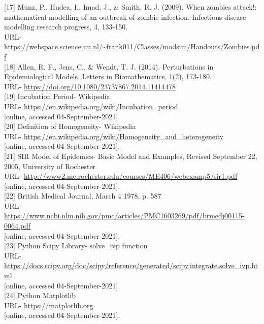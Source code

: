 [17] Munz, P., Hudea, I., Imad, J., \& Smith, R. J. (2009). When zombies attack!: mathematical modelling of an outbreak of zombie infection. Infectious disease modelling research progress, 4, 133-150. \\
URL- \url{https://webspace.science.uu.nl/~frank011/Classes/modsim/Handouts/Zombies.pdf} \\

[18] Allen, R. F., Jens, C., \& Wendt, T. J. (2014). Perturbations in Epidemiological Models. Letters in Biomathematics, 1(2), 173-180. \\
URL- \url{https://doi.org/10.1080/23737867.2014.11414478} \\

[19] Incubation Period- Wikipedia \\
URL- \url{https://en.wikipedia.org/wiki/Incubation_period} \\
{[online, accessed 04-September-2021]}. \\

[20] Definition of Homogeneity- Wikipedia  \\
URL- \url{https://en.wikipedia.org/wiki/Homogeneity_and_heterogeneity} \\
{[online, accessed 04-September-2021]}. \\

[21] SIR Model of Epidemics- Basic Model and Examples, Revised September 22, 2005, University of Rochester \\
URL- \url{http://www2.me.rochester.edu/courses/ME406/webexamp5/sir1.pdf} \\
{[online, accessed 04-September-2021]}. \\

[22] British Medical Journal, March 4 1978, p. 587 \\
URL- \url{https://www.ncbi.nlm.nih.gov/pmc/articles/PMC1603269/pdf/brmedj00115-0064.pdf} \\
{[online, accessed 04-September-2021]}. \\

[23] Python Scipy Library- solve\_ivp function \\
URL- \url{https://docs.scipy.org/doc/scipy/reference/generated/scipy.integrate.solve_ivp.html} \\
{[online, accessed 04-September-2021]}. \\

[24] Python Matplotlib \\
URL- \url{https://matplotlib.org} \\
{[online, accessed 04-September-2021]}. \\

